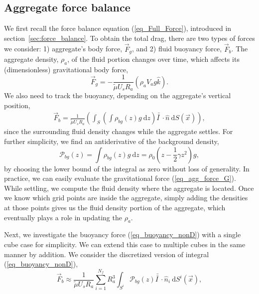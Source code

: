 \subsection{Aggregate force balance}
We first recall the force balance equation (\ref{eq_Full_Force}), introduced in section~\ref{sec:force_balance}. To obtain the total drag, there are two types of forces we consider: 1) aggregate's body force, $\vec{F}_g$, and 2) fluid buoyancy force, $\vec{F}_b$. 
The aggregate density, $\rho_a$, of the fluid portion changes over time, which affects its (dimensionless) gravitational body force,
\begin{equation}
	\vec{F}_g = 
	- \frac{1}{\tilde{\mu} U_s R_a} 
	\left( \rho_a V_a g \hat{k}	 \right).
	\label{eq_agg_force_G}
\end{equation}
We also need to track the buoyancy, depending on the aggregate's vertical position,
\begin{align}
	\vec{F}_{b}
	 = \frac{1}{\tilde{\mu} U_s R_a} 
	 \left(
	  \int_{S} \left( 
	  \int \rho_{bg}(z) g \ \textrm{d}z 
	  \right) \bar{\bar{I \ }}  \cdot
	 \hat{n} \ \textrm{d}S (\vec{x})
   \right),
   \label{eq_buoyancy_nonD}
\end{align}
since the surrounding fluid density changes while the aggregate settles.
For further simplicity, we find an antiderivative of the background density,
\begin{equation}
	\mathcal{P}_{bg}(z) =  \int \rho_{bg}(z) g \ \textrm{d}z 
	 = \rho_0 \left( z - \frac{1}{2}\gamma z^2 \right) g,
\end{equation}
by choosing the lower bound of the integral as zero without loss of generality.
In practice, we can easily evaluate the gravitational force (\ref{eq_agg_force_G}). While settling, we compute the fluid density where the aggregate is located. Once we know which grid points are inside the aggregate, simply adding the densities at those points gives us the fluid density portion of the aggregate, which eventually plays a role in updating the $\rho_a$. 
\par
Next, we investigate the buoyancy force (\ref{eq_buoyancy_nonD}) with a single cube case for simplicity. 
We can extend this case to multiple cubes in the same manner by addition. We consider the discretized version of integral (\ref{eq_buoyancy_nonD}), 
\begin{equation}
	\vec{F}_b \approx
	\frac{1}{\tilde{\mu} U_s R_a} 
	\sum_{i=1}^{N_f}
	 R_a^3 \int_{S^i} 
		\mathcal{P}_{bg}(z) 
	 \bar{\bar{I \ }}  \cdot
	\hat{n}_i \ \textrm{d}S^i (\vec{x}),
\label{eq_buoyancy_discrete2}
\end{equation}
